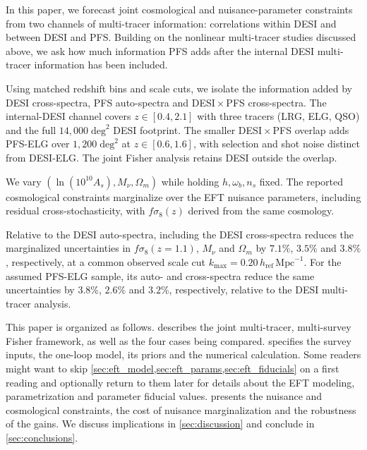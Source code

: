 \documentclass[a4paper,11pt]{article}
\newcommand{\revchange}[1]{{\color{RevisionColor}#1}}
\newcommand{\Om}{\Omega_m}
\newcommand{\se}{\ensuremath{\sigma_{8}}\xspace}
\newcommand{\Mnu}{M_\nu}
\begin{document}
\revchange{In this paper, we forecast joint cosmological and nuisance-parameter
constraints from two channels of multi-tracer information: correlations
within DESI and between DESI and PFS. Building on the nonlinear multi-tracer
studies discussed above, we ask how much information PFS adds after the
internal DESI multi-tracer information has been included.}

\revchange{Using matched redshift bins and scale cuts, we isolate the information added by DESI cross-spectra,
PFS auto-spectra and DESI\,$\times$\,PFS cross-spectra.}
The internal-DESI channel covers $z\in[0.4,2.1]$ with three tracers
(LRG, ELG, QSO) and the full \revchange{$14{,}000\;\mathrm{deg}^2$}
DESI footprint. \revchange{The smaller DESI\,$\times$\,PFS overlap adds
PFS-ELG over $1{,}200\;\mathrm{deg}^2$ at $z\in[0.6,1.6]$,}
with selection and shot noise distinct from DESI-ELG\revchange{.
The joint Fisher analysis retains DESI outside the overlap.}

\revchange{We vary
$(\ln(10^{10}A_s),\Mnu,\Om)$ while holding $h,\omega_b,n_s$ fixed.
The reported cosmological constraints marginalize over the EFT nuisance
parameters, including residual cross-stochasticity, with $f\se(z)$
derived from the same cosmology.}

\revchange{Relative to the DESI auto-spectra,
including the DESI cross-spectra reduces the marginalized uncertainties
in $f\se(z=1.1)$, $\Mnu$ and $\Omega_m$ by
$7.1\%$, $3.5\%$ and $3.8\%$, respectively, at a common observed scale cut
$k_{\mathrm{max}}=0.20\,h_{\mathrm{ref}}\,\mathrm{Mpc}^{-1}$.
For the assumed PFS-ELG sample,
its auto- and cross-spectra reduce the same uncertainties by
$3.8\%$, $2.6\%$ and $3.2\%$, respectively, relative to the
DESI multi-tracer analysis.}

This paper is organized as follows.  describes the joint multi-tracer, multi-survey Fisher framework\revchange{, as well as the four cases being compared.
\Cref{sec:fisher} specifies the survey inputs, the one-loop model, its priors and the numerical calculation.
Some readers might want to skip \cref{sec:eft_model,sec:eft_params,sec:eft_fiducials} on a first reading and optionally return to them later for details about the EFT modeling, parametrization and parameter fiducial values.}
 presents the \revchange{nuisance and cosmological constraints, the cost of
nuisance marginalization and the robustness of the gains}.
We discuss implications in \cref{sec:discussion} and conclude in
\cref{sec:conclusions}.
\end{document}
